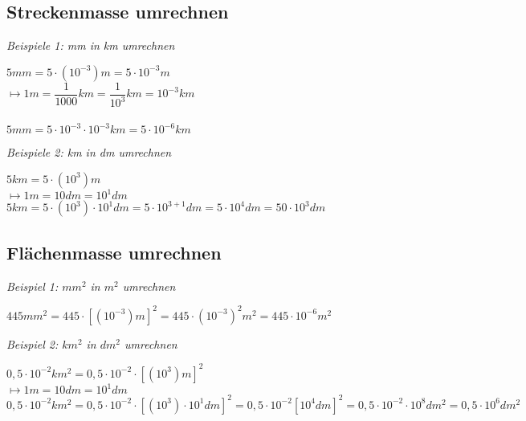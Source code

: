 \documentclass[11pt, a4paper, twoside, fleqn]{article}
\begin{document}
\subsection{Streckenmasse umrechnen}
\begin{flushleft}
\emph{Beispiele 1: mm in km umrechnen} 
\end{flushleft}
\(5mm = 5 \cdot (10^{-3})m = 5\cdot10^{-3} m \) \\
\(\mapsto 1m = \dfrac{1}{1000} km = \dfrac{1}{10^3}km = 10^{-3} km \) \\~\\
\( 5mm = 5 \cdot 10^{-3} \cdot10^{-3} km = 5 \cdot10^{-6} km\) 
\begin{flushleft}
\emph{Beispiele 2: km in dm umrechnen}
\end{flushleft}
\(5km = 5 \cdot(10^3)m\) \\
\(\mapsto 1m = 10 dm = 10^1 dm\) \\
\(5 km = 5 \cdot (10^3) \cdot 10^1 dm = 5 \cdot 10^{3+1} dm = 5 \cdot 10^4 dm = 50 \cdot 10^3 dm\)
\subsection{Flächenmasse umrechnen}
\begin{flushleft}
\emph{Beispiel 1: \(mm^2\) in \(m^2\) umrechnen}
\end{flushleft}
\(445mm^2 = 445 \cdot[(10^{-3})m]^2 = 445 \cdot(10^{-3})^2 m^2 = 445 \cdot 10^{-6} m^2\) 
\begin{flushleft}
\emph{Beispiel 2: \( km^2\) in \(dm^2\) umrechnen}
\end{flushleft}
\(0,5 \cdot10^{-2} km^2 = 0,5 \cdot 10^{-2} \cdot [(10^3)m]^2\) \\
\(\mapsto 1 m = 10 dm = 10^1 dm\) \\ 
\(0,5\cdot10^{-2}km^2 = 0,5 \cdot10^{-2} \cdot[(10^3) \cdot10^1 dm]^2 = 0,5 \cdot10^{-2} [10^4 dm]^2 = 0,5 \cdot10^{-2} \cdot10^8 dm^2 = 0,5 \cdot 10^6 dm^2\)
\end{document}
